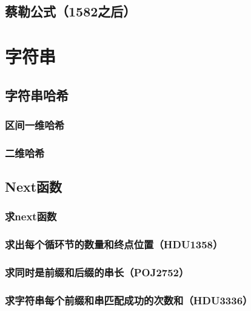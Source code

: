 \documentclass[landscape,twoside,a4paper]{article}
\begin{document}
\subsection{蔡勒公式（1582之后）}


\section{字符串}

\subsection{字符串哈希}
\subsubsection{区间一维哈希}

\subsubsection{二维哈希}




\subsection{Next函数}

\subsubsection{求next函数}


\subsubsection{求出每个循环节的数量和终点位置（HDU1358）}


\subsubsection{求同时是前缀和后缀的串长（POJ2752）}


\subsubsection{求字符串每个前缀和串匹配成功的次数和（HDU3336）}

\end{document}
